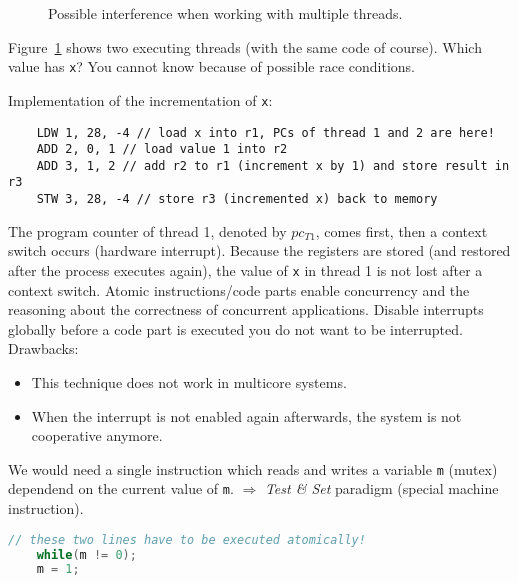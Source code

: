 {\begin{figure}[H]
		\caption{Possible interference when working with multiple threads.}
		\label{fig:possinterferencemultithreads}
	\end{figure}	
	\par{
		\noindent
		Figure~\ref{fig:possinterferencemultithreads} shows two executing threads (with the same code of course). Which value has \texttt{x}? You cannot know because of possible race conditions.
	}
	\par{
		\noindent Implementation of the incrementation of \texttt{x}:
		\parskip0pt\begin{verbatim}
	LDW 1, 28, -4 // load x into r1, PCs of thread 1 and 2 are here! 
	ADD 2, 0, 1 // load value 1 into r2
	ADD 3, 1, 2 // add r2 to r1 (increment x by 1) and store result in r3
	STW 3, 28, -4 // store r3 (incremented x) back to memory
    	\end{verbatim}
	}
	\par{
		\noindent
		The program counter of thread 1, denoted by $pc_{T1}$, comes first, then a context switch occurs (hardware interrupt). Because the registers are stored (and restored after the process executes again), the value of \texttt{x} in thread 1 is not lost after a context switch. \newline
		Atomic instructions/code parts enable concurrency and the reasoning about the correctness of concurrent applications. \newline
		Disable interrupts globally before a code part is executed you do not want to be interrupted. \newline
		Drawbacks:
		\begin{itemize}
			\item{This technique does not work in multicore systems.}
			\item{When the interrupt is not enabled again afterwards, the system is not cooperative anymore.}
		\end{itemize}
	}

	\clearpage
	\par{
		\noindent
		We would need a single instruction which reads and writes a variable \texttt{m} (mutex) dependend on the current value of \texttt{m}. $\Rightarrow$ \textit{Test \& Set} paradigm (special machine instruction).
		\begin{lstlisting}[language = C, frame = none]
	// these two lines have to be executed atomically!
	while(m != 0);
	m = 1;


\end{lstlisting}}}
